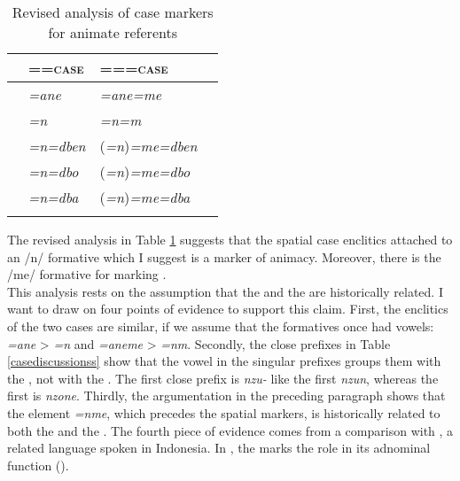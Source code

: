 \begin{table}[H]
\begin{center}
\caption{Revised analysis of case markers for animate referents} 
\label{casediscussionshist} 
	\begin{tabular}{llll}	
		\lsptoprule
		&=\Anim=\textsc{case}&=\Anim=\Nsg{}=\textsc{case}\\ \hline
		\Poss{}&\emph{=ane}&\emph{=ane=me}\\ 
		\Dat{}&\emph{=n}&\emph{=n=m}\\ 
		\Loc{}&\emph{=n=dben}&(\emph{=n})\emph{=me=dben}\\ 
		\All{}&\emph{=n=dbo}&(\emph{=n})\emph{=me=dbo}\\ 
		\Abl{}&\emph{=n=dba}&(\emph{=n})\emph{=me=dba}\\ 
		\lspbottomrule
	\end{tabular}
\end{center}
\end{table}%

The revised analysis in Table \ref{casediscussionshist} suggests that the spatial case enclitics attached to an /n/  formative which I suggest is a marker of animacy. Moreover, there is the /me/ formative for marking  .\\ 

This analysis rests on the assumption that the  and the  are historically related. I want to draw on four points of evidence to support this claim. First, the enclitics of the two cases are similar, if we assume that the  formatives once had vowels: \emph{=ane} > \emph{=n} and \emph{=aneme} > \emph{=nm}. Secondly, the close  prefixes in Table \ref{casediscussionss} show that the vowel in the singular prefixes groups them with the , not with the . The first  close  prefix is \emph{nzu-} like the first    \emph{nzun}, whereas the first    is \emph{nzone}. Thirdly, the argumentation in the preceding paragraph shows that the element \emph{=nme}, which precedes the spatial  markers, is historically related to both the  and the . The fourth piece of evidence comes from a comparison with , a related  language spoken in Indonesia. In , the  marks the  role in its adnominal function (\citealt{Carroll:Ngkolmpu}).\\

